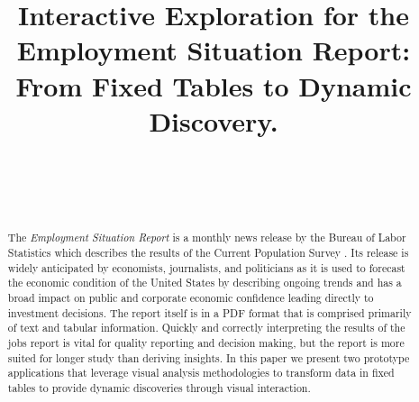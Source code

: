 \documentclass{sigchi}
\begin{document}
\title{Interactive Exploration for the Employment Situation Report: From Fixed Tables to Dynamic Discovery.}


\author{%
  \\
  \\
  \\
}

\maketitle

\begin{abstract}
The \textit{Employment Situation Report} is a monthly news release by the Bureau of Labor Statistics which describes the results of the Current Population Survey \cite{_employment_2015}. Its release is widely anticipated by economists, journalists, and politicians as it is used to forecast the economic condition of the United States by describing ongoing trends and has a broad impact on public and corporate economic confidence leading directly to investment decisions. The report itself is in a PDF format that is comprised primarily of text and tabular information. Quickly and correctly interpreting the results of the jobs report is vital for quality reporting and decision making, but the report is more suited for longer study than deriving insights. In this paper we present two prototype applications that leverage visual analysis methodologies to transform data in fixed tables to provide dynamic discoveries through visual interaction.
\end{abstract}
\end{document}
